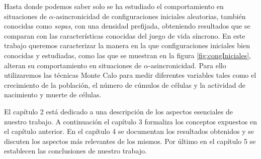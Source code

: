\documentclass[../proyecto.tex]{book}
\begin{document}
Hasta donde podemos saber solo se ha estudiado el comportamiento en situaciones de $\alpha$-asincronicidad de configuraciones iniciales aleatorias, también conocidas como \textit{sopas}, con una densidad prefijada, obteniendo resultados que se comparan con las características conocidas del juego de vida síncrono. En este trabajo queremos caracterizar la manera en la que configuraciones iniciales bien conocidas y estudiadas, como las que se muestran en la figura \ref{fig:congIniciales}, alteran su comportamiento en situaciones de $\alpha$-asincronicidad. Para ello utilizaremos las técnicas Monte Calo para medir diferentes variables tales como el crecimiento de la población, el número de cúmulos de células y la actividad de nacimiento y muerte de células.

El capítulo 2 está dedicado a una descripción de los aspectos esenciales de nuestro trabajo. A continuación el capítulo 3 formaliza los conceptos expuestos en el capítulo anterior. En el capítulo 4 se documentan los resultados obtenidos y se discuten los aspectos más relevantes de los mismos. Por último en el capítulo 5 se establecen las conclusiones de nuestro trabajo. 
\end{document}
